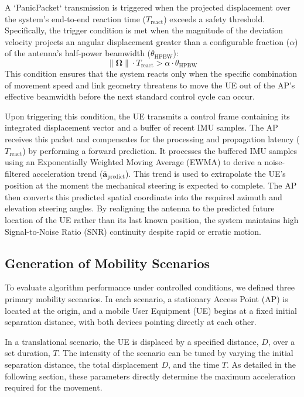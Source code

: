 \documentclass[fleqn,10pt]{wlscirep}
\begin{document}
A `PanicPacket` transmission is triggered when the projected displacement over the system's end-to-end reaction time ($T_{\text{react}}$) exceeds a safety threshold. Specifically, the trigger condition is met when the magnitude of the deviation velocity projects an angular displacement greater than a configurable fraction ($\alpha$) of the antenna's half-power beamwidth ($\theta_{\text{HPBW}}$):
\begin{equation}
    \|\boldsymbol{\Omega}\| \cdot T_{\text{react}} > \alpha \cdot \theta_{\text{HPBW}}
\end{equation}
This condition ensures that the system reacts only when the specific combination of movement speed and link geometry threatens to move the UE out of the AP's effective beamwidth before the next standard control cycle can occur.

Upon triggering this condition, the UE transmits a control frame containing its integrated displacement vector and a buffer of recent IMU samples. The AP receives this packet and compensates for the processing and propagation latency ($T_{\text{react}}$) by performing a forward prediction. It processes the buffered IMU samples using an Exponentially Weighted Moving Average (EWMA) to derive a noise-filtered acceleration trend ($\bar{\mathbf{a}}_{\text{predict}}$). This trend is used to extrapolate the UE's position at the moment the mechanical steering is expected to complete. The AP then converts this predicted spatial coordinate into the required azimuth and elevation steering angles. By realigning the antenna to the predicted future location of the UE rather than its last known position, the system maintains high Signal-to-Noise Ratio (SNR) continuity despite rapid or erratic motion.

\subsection*{Generation of Mobility Scenarios}
To evaluate algorithm performance under controlled conditions, we defined three primary mobility scenarios. In each scenario, a stationary Access Point (AP) is located at the origin, and a mobile User Equipment (UE) begins at a fixed initial separation distance, with both devices pointing directly at each other.

In a translational scenario, the UE is displaced by a specified distance, $D$, over a set duration, $T$. The intensity of the scenario can be tuned by varying the initial separation distance, the total displacement $D$, and the time $T$. As detailed in the following section, these parameters directly determine the maximum acceleration required for the movement.
\end{document}
